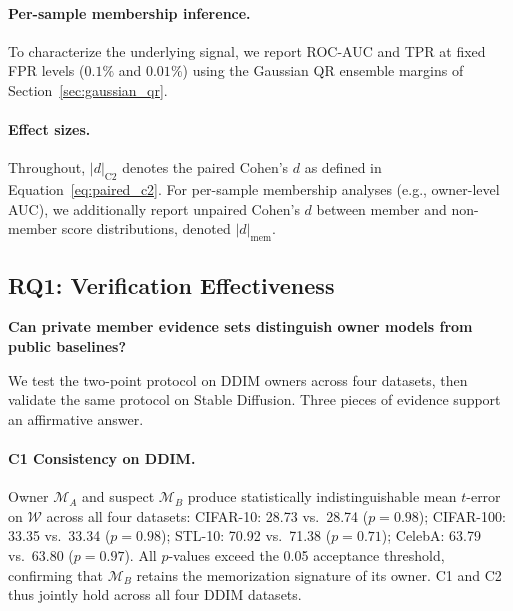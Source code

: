 \documentclass{article}
\begin{document}
\paragraph{Per-sample membership inference.}
To characterize the underlying signal, we report ROC-AUC and TPR at fixed FPR levels ($0.1\%$ and $0.01\%$) using the Gaussian QR ensemble margins of Section~\ref{sec:gaussian_qr}.

\paragraph{Effect sizes.}
Throughout, $|d|_{\text{C2}}$ denotes the paired Cohen's $d$ as defined in Equation~\ref{eq:paired_c2}. For per-sample membership analyses (e.g., owner-level AUC), we additionally report unpaired Cohen's $d$ between member and non-member score distributions, denoted $|d|_{\text{mem}}$.


\subsection{RQ1: Verification Effectiveness}
\label{sec:main_results}

\textbf{Can private member evidence sets distinguish owner models from public baselines?}

We test the two-point protocol on DDIM owners across four datasets, then validate the same protocol on Stable Diffusion. Three pieces of evidence support an affirmative answer.

\paragraph{C1 Consistency on DDIM.}
Owner $\mathcal{M}_A$ and suspect $\mathcal{M}_B$ produce 
statistically indistinguishable mean $t$-error on $\mathcal{W}$ 
across all four datasets: 
CIFAR-10: 28.73 vs.\ 28.74 ($p = 0.98$);
CIFAR-100: 33.35 vs.\ 33.34 ($p = 0.98$);
STL-10: 70.92 vs.\ 71.38 ($p = 0.71$);
CelebA: 63.79 vs.\ 63.80 ($p = 0.97$).
All $p$-values exceed the 0.05 acceptance threshold, confirming 
that $\mathcal{M}_B$ retains the memorization signature of its 
owner. C1 and C2 thus jointly hold across all four DDIM datasets.
\end{document}
